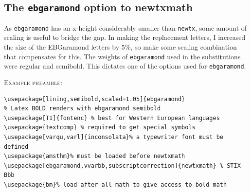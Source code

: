\documentclass[\fsc]{article}
\theoremstyle{oldplain}
\theoremstyle{plain}
\begin{document}
\subsection*{The {\tt ebgaramond} option to newtxmath}
As {\tt ebgaramond} has an x-height considerably smaller than {\tt newtx}, some amount of scaling is useful to bridge the gap. In making the replacement letters, I increased the size of the EBGaramond letters by 5\%, so make some scaling combination that compensates for this. The weights of {\tt ebgaramond} used in the substitutions were regular and semibold. This dictates one of the options used for {\tt ebgaramond}.

\textsc{Example preamble:}\\
\begin{verbatim}
\usepackage[lining,semibold,scaled=1.05]{ebgaramond} 
% Latex BOLD renders with ebgaramond semibold 
\usepackage[T1]{fontenc} % best for Western European languages
\usepackage{textcomp} % required to get special symbols
\usepackage[varqu,varl]{inconsolata}% a typewriter font must be defined
\usepackage{amsthm}% must be loaded before newtxmath
\usepackage[ebgaramond,vvarbb,subscriptcorrection]{newtxmath} % STIX Bbb
\usepackage{bm}% load after all math to give access to bold math
\end{verbatim}
\end{document}
